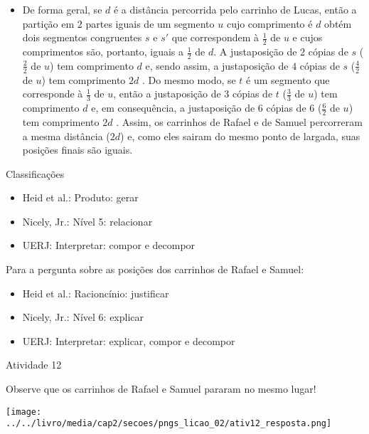 \documentclass[oneside]{book}
\begin{document}
\begin{multicols}{2}
\begin{itemize}
    \item       De forma geral, se       $d$       é a distância percorrida pelo carrinho de Lucas, então a partição em       $2$       partes iguais de um segmento       $u$       cujo comprimento é       $d$       obtém dois segmentos congruentes       $s$       e       $s'$       que correspondem à       $\frac{1}{2}$       de       $u$       e cujos comprimentos são, portanto, iguais a       $\frac{1}{2}$       de       $d$. A justaposição de       $2$       cópias de       $s$       ($\frac{2}{2}$       de       $u$) tem comprimento       $d$       e, sendo assim, a justaposição de       $4$       cópias de       $s$       ($\frac{4}{2}$ de $u$) tem comprimento       $2d$      . Do mesmo modo, se       $t$       é um segmento que corresponde à       $\frac{1}{3}$       de       $u$, então a justaposição de       $3$       cópias de       $t$       ($\frac{3}{3}$       de       $u$) tem comprimento       $d$       e, em consequência, a justaposição de       $6$       cópias de       $6$       ($\frac{6}{2}$       de       $u$) tem comprimento       $2d$      . Assim, os carrinhos de Rafael e de Samuel percorreram a mesma distância ($2d$) e, como eles sairam do mesmo ponto de largada, suas posições finais são iguais.
\end{itemize} %


  Classificações
\begin{itemize} %
    \item       Heid et al.: Produto: gerar
    \item       Nicely, Jr.: Nível 5: relacionar
    \item       UERJ: Interpretar: compor e decompor
\end{itemize} %


  Para a pergunta sobre as posições dos carrinhos de Rafael e Samuel:
\begin{itemize} %
    \item       Heid et al.: Racioncínio: justificar
    \item       Nicely, Jr.: Nível 6: explicar
    \item       UERJ: Interpretar: explicar, compor e decompor
\end{itemize} %


\begin{resposta*}{Atividade 12}

Observe que os carrinhos de Rafael e Samuel pararam no mesmo lugar!

\hspace{-15mm} \texttt{[image: ../../livro/media/cap2/secoes/pngs\_licao\_02/ativ12\_resposta.png]}


\end{resposta*}
\end{multicols}
\end{document}
